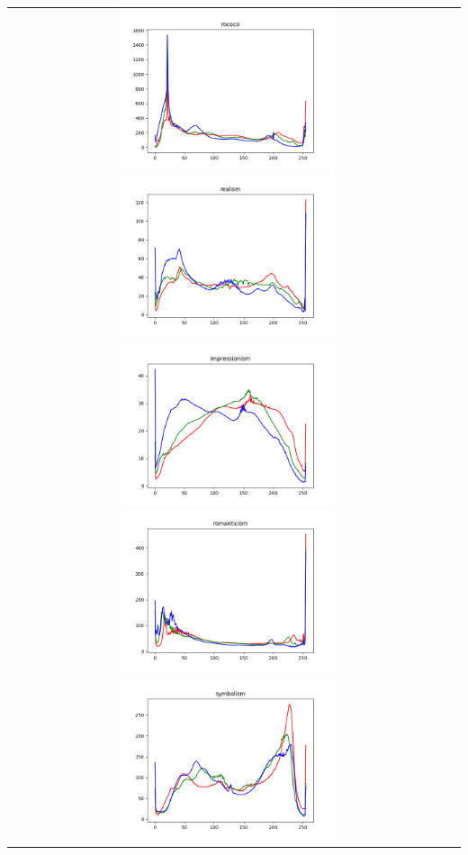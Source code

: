 \documentclass{article}
\begin{document}
\begin{center}
\begin{tabular}{cc}
				\noindent
				\includegraphics[width=0.5\textwidth]{plots/rococo.png}
				\includegraphics[width=0.5\textwidth]{plots/realism.png}\\[2em]
				\includegraphics[width=0.5\textwidth]{plots/impressionism.png}
				\includegraphics[width=0.5\textwidth]{plots/romanticism.png}\\[2em]
				\includegraphics[width=0.5\textwidth]{plots/symbolism.png}

\end{tabular}
\end{center}
\end{document}

